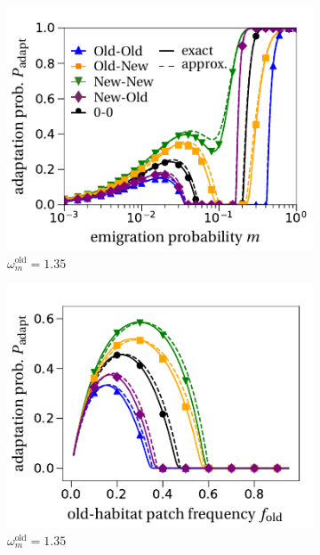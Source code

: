 \documentclass[11pt]{article}
\begin{document}
\begin{figure}[t!]
	\centering
		\begin{subfigure}{.5\textwidth}
 		 \centering
 		 \includegraphics[width=\linewidth]{fig3a.pdf}
  		\caption{$\omega^\text{old}_m=1.35$}
  		\label{fig:source_sink_m-35}
	\end{subfigure}%
	    \begin{subfigure}{.5\textwidth}
 		 \centering
 		 \includegraphics[width=\linewidth]{fig3b.pdf}
  		\caption{$\omega^\text{old}_m=1.35$}
  		\label{fig:source_sink_f-35}
	\end{subfigure}
	\begin{subfigure}{.5\textwidth}

\end{subfigure}
\end{figure}
\end{document}
